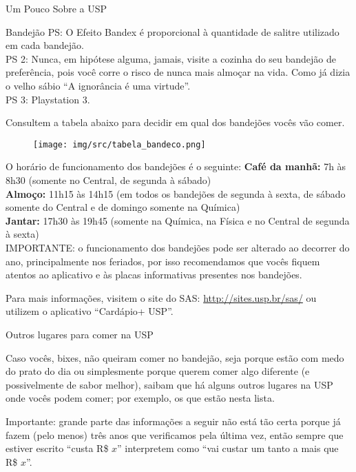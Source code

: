 \begin{secao}{Um Pouco Sobre a USP}
\begin{subsecao}{Bandejão}
PS: O Efeito Bandex é proporcional à quantidade de salitre utilizado em cada
bandejão.\\
PS 2: Nunca, em hipótese alguma, jamais, visite a cozinha do seu bandejão de
preferência, pois você corre o risco de nunca mais almoçar na vida. Como já
dizia o velho sábio ``A ignorância é uma virtude''.\\
PS 3: Playstation 3.

Consultem a tabela abaixo para decidir em qual dos bandejões vocês vão comer.

\begin{figure}[!htbp]
\begin{center}
 	\texttt{[image: img/src/tabela\_bandeco.png]}
\end{center}
\end{figure}


O horário de funcionamento dos bandejões é o seguinte:
\textbf{Café da manhã:} 7h às 8h30 (somente no Central, de segunda à sábado)\\
\textbf{Almoço:} 11h15 às 14h15 (em todos os bandejões de segunda à sexta, de sábado 
somente do Central e de domingo somente na Química)\\
\textbf{Jantar:} 17h30 às 19h45 (somente na Química, na Física e no Central de segunda à sexta)\\

IMPORTANTE: o funcionamento dos bandejões pode ser alterado ao decorrer do ano,
principalmente nos feriados, por isso recomendamos que vocês fiquem atentos ao 
aplicativo e às placas informativas presentes nos bandejões.

Para mais informações, visitem o site do SAS: \url{http://sites.usp.br/sas/} ou
utilizem o aplicativo ``Cardápio+ USP''.

\end{subsecao}

\begin{subsecao}{Outros lugares para comer na USP}

Caso vocês, bixes, não queiram comer no bandejão, seja porque estão com medo do
prato do dia ou simplesmente porque querem comer algo diferente (e
possivelmente de sabor melhor), saibam que há alguns outros lugares na USP onde
vocês podem comer; por exemplo, os que estão nesta lista.

Importante: grande parte das informações a seguir não está tão certa porque já
fazem (pelo menos) três anos que verificamos pela última vez, então sempre que estiver
escrito ``custa R\$ $x$'' interpretem como ``vai custar um tanto a mais que R\$ $x$''.


\end{subsecao}
\end{secao}
